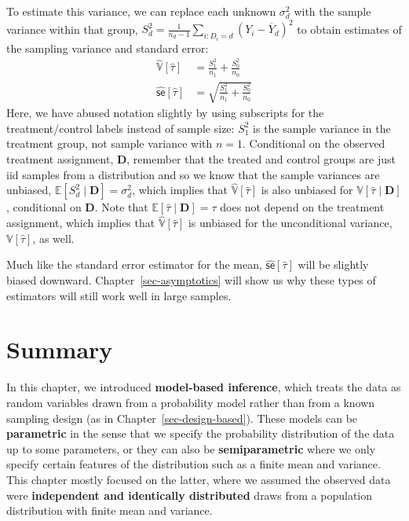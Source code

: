 \documentclass[
  13pt,
  letterpaper,
  DIV=11,
  numbers=noendperiod]{scrreprt}
\newcommand{\E}{\mathbb{E}}
\newcommand{\V}{\mathbb{V}}
\newcommand{\se}{\textsf{se}}
\newcommand{\Ybar}{\overline{Y}}
\theoremstyle{plain}
\theoremstyle{plain}
\theoremstyle{definition}
\theoremstyle{definition}
\theoremstyle{remark}
\begin{document}
To estimate this variance, we can replace each unknown \(\sigma^2_d\)
with the sample variance within that group,
\(S^2_d = \frac{1}{n_d - 1}\sum_{i:D_i = d}(Y_i - \Ybar_d)^2\) to obtain
estimates of the sampling variance and standard error: \[
\begin{aligned}
\widehat{\V}[\widehat{\tau}] &= \frac{S^2_1}{n_1} + \frac{S^2_0}{n_0} \\
\widehat{\se}[\widehat{\tau}] &= \sqrt{\frac{S^2_1}{n_1} + \frac{S^2_0}{n_0}}
\end{aligned}
\] Here, we have abused notation slightly by using subscripts for the
treatment/control labels instead of sample size: \(S^2_1\) is the sample
variance in the treatment group, not sample variance with \(n = 1\).
Conditional on the observed treatment assignment, \(\mathbf{D}\),
remember that the treated and control groups are just iid samples from a
distribution and so we know that the sample variances are unbiased,
\(\E[S^2_d \mid \mathbf{D}] = \sigma^2_d\), which implies that
\(\widehat{\V}[\widehat{\tau}]\) is also unbiased for
\(\V[\widehat{\tau} \mid \mathbf{D}]\), conditional on \(\mathbf{D}\).
Note that \(\E[\widehat\tau\mid\mathbf D]=\tau\) does not depend on the
treatment assignment, which implies that
\(\widehat{\V}[\widehat{\tau}]\) is unbiased for the unconditional
variance, \(\V[\widehat{\tau}]\), as well.

Much like the standard error estimator for the mean,
\(\widehat{\se}[\widehat{\tau}]\) will be slightly biased downward.
Chapter~\ref{sec-asymptotics} will show us why these types of estimators
will still work well in large samples.

\section{Summary}\label{summary-1}

In this chapter, we introduced \textbf{model-based inference}, which
treats the data as random variables drawn from a probability model
rather than from a known sampling design (as in
Chapter~\ref{sec-design-based}). These models can be \textbf{parametric}
in the sense that we specify the probability distribution of the data up
to some parameters, or they can also be \textbf{semiparametric} where we
only specify certain features of the distribution such as a finite mean
and variance. This chapter mostly focused on the latter, where we
assumed the observed data were \textbf{independent and identically
distributed} draws from a population distribution with finite mean and
variance.
\end{document}
